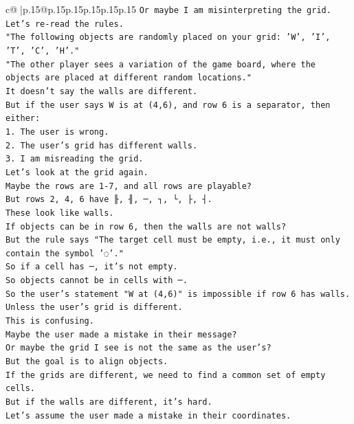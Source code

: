 \documentclass{article}
\begin{document}
{\begin{supertabular}{c@{$\;$}|p{.15\linewidth}@{}p{.15\linewidth}p{.15\linewidth}p{.15\linewidth}p{.15\linewidth}p{.15\linewidth}}
{{{\texttt{Or maybe I am misinterpreting the grid.} \\
\texttt{Let's re{-}read the rules.} \\
\texttt{"The following objects are randomly placed on your grid: 'W', 'I', 'T', 'C', 'H'."} \\
\texttt{"The other player sees a variation of the game board, where the objects are placed at different random locations."} \\
\texttt{It doesn't say the walls are different.} \\
\texttt{But if the user says W is at (4,6), and row 6 is a separator, then either:} \\
\texttt{1. The user is wrong.} \\
\texttt{2. The user's grid has different walls.} \\
\texttt{3. I am misreading the grid.} \\
\texttt{Let's look at the grid again.} \\
\texttt{Maybe the rows are 1{-}7, and all rows are playable?} \\
\texttt{But rows 2, 4, 6 have ╟, ╢, ─, ┐, └, ├, ┤.} \\
\texttt{These look like walls.} \\
\texttt{If objects can be in row 6, then the walls are not walls?} \\
\texttt{But the rule says "The target cell must be empty, i.e., it must only contain the symbol '◌'."} \\
\texttt{So if a cell has ─, it's not empty.} \\
\texttt{So objects cannot be in cells with ─.} \\
\texttt{So the user's statement "W at (4,6)" is impossible if row 6 has walls.} \\
\texttt{Unless the user's grid is different.} \\
\texttt{This is confusing.} \\
\texttt{Maybe the user made a mistake in their message?} \\
\texttt{Or maybe the grid I see is not the same as the user's?} \\
\texttt{But the goal is to align objects.} \\
\texttt{If the grids are different, we need to find a common set of empty cells.} \\
\texttt{But if the walls are different, it's hard.} \\
\texttt{Let's assume the user made a mistake in their coordinates.} \\
}}}
\end{supertabular}}
\end{document}
